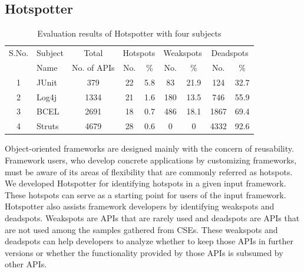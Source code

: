 \subsection{Hotspotter}
\label{sec:hotspotter}

\setlength{\tabcolsep}{1pt}
\begin{table}[t]
\begin{SmallOut}
\begin{CodeOut}
\begin{center}
\begin {tabular} {|c|l|c|c|c|c|c|c|c|}
\hline
S.No.&Subject&Total&\multicolumn{2}{|c|}{Hotspots}&\multicolumn{2}{|c|}{Weakspots}&\multicolumn{2}{|c|}{Deadspots}\\
\cline{4-9}
&Name&No. of APIs&No.&\%&No.&\%&No.&\%\\
\hline 1&JUnit&379&22&5.8&83&21.9&124&32.7\\
\hline 2&Log4j&1334&21&1.6&180&13.5&746&55.9\\
\hline 3&BCEL&2691&18&0.7&486&18.1&1867&69.4\\
\hline 4&Struts&4679&28&0.6&0&0&4332&92.6\\
\hline
\end{tabular}
\centering \caption {\label{tab:hotspotterresults} Evaluation results
 of Hotspotter with four subjects}
\end{center}
\end{CodeOut}
\end{SmallOut}
\vspace*{-4ex}
\end{table}
Object-oriented frameworks are designed mainly with the concern of
reusability. Framework users, who develop concrete applications by
customizing frameworks, must be aware of its areas of flexibility
that are commonly referred as hotspots. We developed Hotspotter for
identifying hotspots in a given input framework. These hotspots can
serve as a starting point for users of the input framework.
Hotspotter also assists framework developers by identifying
weakspots and deadspots. Weakspots are APIs that are rarely used and
deadspots are APIs that are not used among the samples gathered from
CSEs. These weakspots and deadspots can help developers to analyze
whether to keep those APIs in further versions or whether the
functionality provided by those APIs is subsumed by other APIs.

